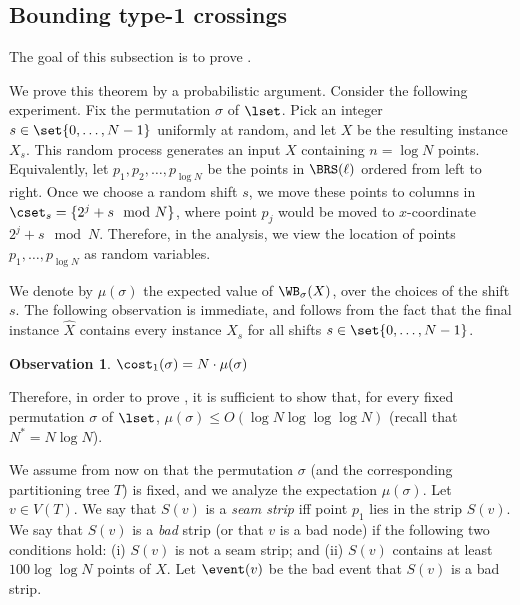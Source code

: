 \documentclass{toc}
\newtheorem{myobs}[theorem]{Observation}
\begin{document}
%


%

%

%

%

%

%

%
%

%

%
%


%
%
%
\subsection{Bounding type-1 crossings}\label{subsec: type 1 crossings}

%
%
%

The goal of this subsection is to prove .

%
%
%


We prove this theorem by a probabilistic argument. 
Consider the following experiment. 
Fix the permutation $\sigma$ of $\lset$.  
%
Pick an integer $s \in \set{0,\ldots, N-1}$ uniformly at random, and let $X$ be the resulting instance $X_s$. 
This random process generates an input $X$ containing $n = \log N$ points.
Equivalently, let $p_1, p_2, \ldots, p_{\log N}$ be the points in $\BRS(\ell)$ ordered from left to right.  
Once we choose a random shift $s$, we move these points  to columns in $\cset_s = \{2^j + s \mod N \}$, where point $p_j$ would be moved to $x$-coordinate $2^j + s \mod N$. 
Therefore, in the analysis, we view the location of points $p_1,\ldots, p_{\log N}$ as random variables.
  
We denote by $\mu(\sigma)$ the expected value of $\WB_{\sigma}(X)$, over the choices of the shift $s$. The following observation is immediate, and follows from the fact that the final instance $\hat X$ contains every instance $X_s$ for all shifts $s\in \set{0,\ldots,N-1}$.

\begin{myobs}
$\cost_1(\sigma) = N \cdot \mu(\sigma)$ 
\end{myobs}  
%

Therefore, in order to prove , it is sufficient to show that, for every fixed permutation $\sigma$ of $\lset$, $\mu(\sigma)\leq  O(\log N\log\log\log N)$ (recall that $N^*=N\log N$).

%
%


We assume from now on that the permutation $\sigma$ (and the corresponding partitioning tree $T$) is fixed, and we analyze the expectation $\mu(\sigma)$.
Let $v \in V(T)$. We say that $S(v)$ is a \emph{seam strip} iff point $p_1$ lies in the strip $S(v)$. 
We say that $S(v)$ is a \emph{bad} strip (or that $v$ is a bad node) if the following two conditions hold: (i) $S(v)$ is not a seam strip; and (ii) $S(v)$ contains at least $100\log\log N$ points of $X$. 
Let $\event(v)$ be the bad event that $S(v)$ is a bad strip.
  
\end{document}
